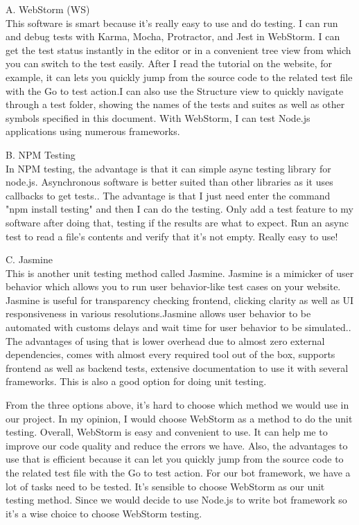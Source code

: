 A. WebStorm (WS)\\
This software is smart because it's really easy to use and do testing. I can run and debug tests with Karma, Mocha, Protractor, and Jest in WebStorm. I can get the test status instantly in the editor or in a convenient tree view from which you can switch to the test easily\cite{webstorm}. After I read the tutorial on the website, for example, it can lets you quickly jump from the source code to the related test file with the Go to test action\cite{webstorm}.I can also use the Structure view to quickly navigate through a test folder, showing the names of the tests and suites as well as other symbols specified in this document\cite{webstorm}. With WebStorm, I can test Node.js applications using numerous frameworks.

B. NPM Testing\\
In NPM testing, the advantage is that it can simple async testing library for node.js. Asynchronous software is better suited than other libraries as it uses callbacks to get tests.\cite{testing}. The advantage is that I just need enter the command "npm install testing" and then I can do the testing. Only add a test feature to my software after doing that, testing if the results are what to expect. Run an async test to read a file's contents and verify that it's not empty\cite{testing}. Really easy to use!

C. Jasmine\\
This is another unit testing method called Jasmine. Jasmine is a mimicker of user behavior which allows you to run user behavior-like test cases on your website. Jasmine is useful for transparency checking frontend, clicking clarity as well as UI responsiveness in various resolutions.Jasmine allows user behavior to be automated with customs delays and wait time for user behavior to be simulated.\cite{jsunit}. The advantages of using that is lower overhead due to almost zero external dependencies, comes with almost every required tool out of the box, supports frontend as well as backend tests, extensive documentation to use it with several frameworks\cite{jsunit}. This is also a good option for doing unit testing.

 
 From the three options above, it's hard to choose which method we would use in our project. In my opinion, I would choose WebStorm as a method to do the unit testing. Overall, WebStorm is easy and convenient to use. It can help me to improve our code quality and reduce the errors we have. Also, the advantages to use that is efficient because it can let you quickly jump from the source code to the related test file with the Go to test action\cite{webstorm}. For our bot framework, we have a lot of tasks need to be tested. It's sensible to choose WebStorm as our unit testing method. Since we would decide to use Node.js to write bot framework so it's a wise choice to choose WebStorm testing.
\\

